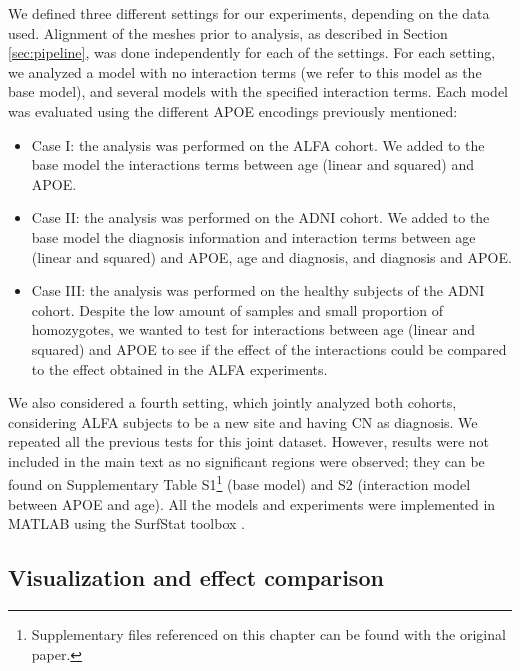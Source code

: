 We defined three different settings for our experiments, depending on the data used. Alignment of the meshes prior to analysis, as described in Section \ref{sec:pipeline}, was done independently for each of the settings. For each setting, we analyzed a model with no interaction terms (we refer to this model as the base model), and several models with the specified interaction terms. Each model was evaluated using the different APOE encodings previously mentioned:

\begin{itemize}
    \item Case I: the analysis was performed on the ALFA cohort. We added to the base model the interactions terms between age (linear and squared) and APOE. 
    \item Case II: the analysis was performed on the ADNI cohort. We added to the base model the diagnosis information and interaction terms between age (linear and squared) and APOE, age and diagnosis, and diagnosis and APOE.
    \item Case III: the analysis was performed on the healthy subjects of the ADNI cohort. Despite the low amount of samples and small proportion of homozygotes, we wanted to test for interactions between age (linear and squared) and APOE to see if the effect of the interactions could be compared to the effect obtained in the ALFA experiments.
\end{itemize}

We also considered a fourth setting, which jointly analyzed both cohorts, considering ALFA subjects to be a new site and having CN as diagnosis. We repeated all the previous tests for this joint dataset. However, results were not included in the main text as no significant regions were observed; they can be found on Supplementary Table S1\footnote{Supplementary files referenced on this chapter can be found with the original paper.} (base model) and S2 (interaction model between APOE and age). All the models and experiments were implemented in MATLAB using the SurfStat toolbox \cite{Worsley2009}.\\ 

\subsection{Visualization and effect comparison}
\label{sec:visualization}


